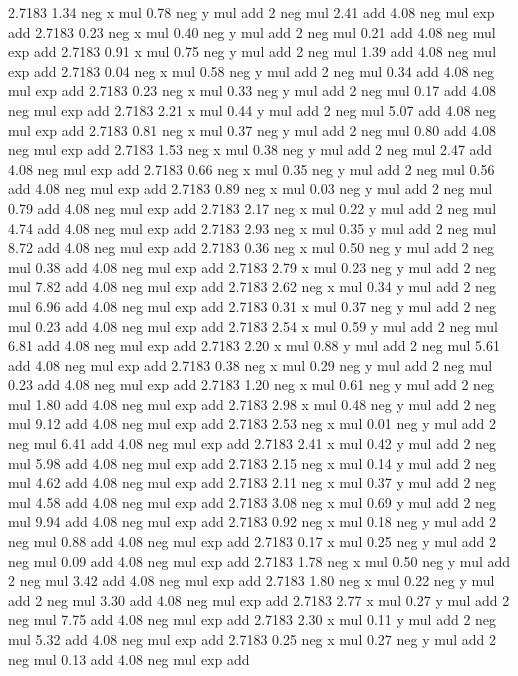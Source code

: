 2.7183 1.34 neg x mul 0.78 neg y mul add 2 neg mul 2.41 add 4.08 neg mul exp add %
2.7183 0.23 neg x mul 0.40 neg y mul add 2 neg mul 0.21 add 4.08 neg mul exp add %
2.7183 0.91 x mul 0.75 neg y mul add 2 neg mul 1.39 add 4.08 neg mul exp add %
2.7183 0.04 neg x mul 0.58 neg y mul add 2 neg mul 0.34 add 4.08 neg mul exp add %
2.7183 0.23 neg x mul 0.33 neg y mul add 2 neg mul 0.17 add 4.08 neg mul exp add %
2.7183 2.21 x mul 0.44 y mul add 2 neg mul 5.07 add 4.08 neg mul exp add %
2.7183 0.81 neg x mul 0.37 neg y mul add 2 neg mul 0.80 add 4.08 neg mul exp add %
2.7183 1.53 neg x mul 0.38 neg y mul add 2 neg mul 2.47 add 4.08 neg mul exp add %
2.7183 0.66 neg x mul 0.35 neg y mul add 2 neg mul 0.56 add 4.08 neg mul exp add %
2.7183 0.89 neg x mul 0.03 neg y mul add 2 neg mul 0.79 add 4.08 neg mul exp add %
2.7183 2.17 neg x mul 0.22 y mul add 2 neg mul 4.74 add 4.08 neg mul exp add %
2.7183 2.93 neg x mul 0.35 y mul add 2 neg mul 8.72 add 4.08 neg mul exp add %
2.7183 0.36 neg x mul 0.50 neg y mul add 2 neg mul 0.38 add 4.08 neg mul exp add %
2.7183 2.79 x mul 0.23 neg y mul add 2 neg mul 7.82 add 4.08 neg mul exp add %
2.7183 2.62 neg x mul 0.34 y mul add 2 neg mul 6.96 add 4.08 neg mul exp add %
2.7183 0.31 x mul 0.37 neg y mul add 2 neg mul 0.23 add 4.08 neg mul exp add %
2.7183 2.54 x mul 0.59 y mul add 2 neg mul 6.81 add 4.08 neg mul exp add %
2.7183 2.20 x mul 0.88 y mul add 2 neg mul 5.61 add 4.08 neg mul exp add %
2.7183 0.38 neg x mul 0.29 neg y mul add 2 neg mul 0.23 add 4.08 neg mul exp add %
2.7183 1.20 neg x mul 0.61 neg y mul add 2 neg mul 1.80 add 4.08 neg mul exp add %
2.7183 2.98 x mul 0.48 neg y mul add 2 neg mul 9.12 add 4.08 neg mul exp add %
2.7183 2.53 neg x mul 0.01 neg y mul add 2 neg mul 6.41 add 4.08 neg mul exp add %
2.7183 2.41 x mul 0.42 y mul add 2 neg mul 5.98 add 4.08 neg mul exp add %
2.7183 2.15 neg x mul 0.14 y mul add 2 neg mul 4.62 add 4.08 neg mul exp add %
2.7183 2.11 neg x mul 0.37 y mul add 2 neg mul 4.58 add 4.08 neg mul exp add %
2.7183 3.08 neg x mul 0.69 y mul add 2 neg mul 9.94 add 4.08 neg mul exp add %
2.7183 0.92 neg x mul 0.18 neg y mul add 2 neg mul 0.88 add 4.08 neg mul exp add %
2.7183 0.17 x mul 0.25 neg y mul add 2 neg mul 0.09 add 4.08 neg mul exp add %
2.7183 1.78 neg x mul 0.50 neg y mul add 2 neg mul 3.42 add 4.08 neg mul exp add %
2.7183 1.80 neg x mul 0.22 neg y mul add 2 neg mul 3.30 add 4.08 neg mul exp add %
2.7183 2.77 x mul 0.27 y mul add 2 neg mul 7.75 add 4.08 neg mul exp add %
2.7183 2.30 x mul 0.11 y mul add 2 neg mul 5.32 add 4.08 neg mul exp add %
2.7183 0.25 neg x mul 0.27 neg y mul add 2 neg mul 0.13 add 4.08 neg mul exp add %
